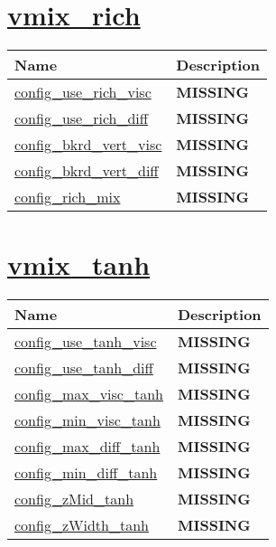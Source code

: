 \section[vmix\_rich]{\hyperref[sec:nm_sec_vmix_rich]{vmix\_rich}}
\label{sec:nm_tab_vmix_rich}
{\small
\begin{center}
\begin{longtable}{| p{2.0in} || p{4.0in} |}
	\hline
	{\bf Name} & {\bf Description} \\
	\hline
	\hline
	\hyperref[subsec:nm_sec_config_use_rich_visc]{config\_use\_rich\_visc} & {\bf \color{red} MISSING} \\
	\hline
	\hyperref[subsec:nm_sec_config_use_rich_diff]{config\_use\_rich\_diff} & {\bf \color{red} MISSING} \\
	\hline
	\hyperref[subsec:nm_sec_config_bkrd_vert_visc]{config\_bkrd\_vert\_visc} & {\bf \color{red} MISSING} \\
	\hline
	\hyperref[subsec:nm_sec_config_bkrd_vert_diff]{config\_bkrd\_vert\_diff} & {\bf \color{red} MISSING} \\
	\hline
	\hyperref[subsec:nm_sec_config_rich_mix]{config\_rich\_mix} & {\bf \color{red} MISSING} \\
	\hline
\end{longtable}
\end{center}
}
\section[vmix\_tanh]{\hyperref[sec:nm_sec_vmix_tanh]{vmix\_tanh}}
\label{sec:nm_tab_vmix_tanh}
{\small
\begin{center}
\begin{longtable}{| p{2.0in} || p{4.0in} |}
	\hline
	{\bf Name} & {\bf Description} \\
	\hline
	\hline
	\hyperref[subsec:nm_sec_config_use_tanh_visc]{config\_use\_tanh\_visc} & {\bf \color{red} MISSING} \\
	\hline
	\hyperref[subsec:nm_sec_config_use_tanh_diff]{config\_use\_tanh\_diff} & {\bf \color{red} MISSING} \\
	\hline
	\hyperref[subsec:nm_sec_config_max_visc_tanh]{config\_max\_visc\_tanh} & {\bf \color{red} MISSING} \\
	\hline
	\hyperref[subsec:nm_sec_config_min_visc_tanh]{config\_min\_visc\_tanh} & {\bf \color{red} MISSING} \\
	\hline
	\hyperref[subsec:nm_sec_config_max_diff_tanh]{config\_max\_diff\_tanh} & {\bf \color{red} MISSING} \\
	\hline
	\hyperref[subsec:nm_sec_config_min_diff_tanh]{config\_min\_diff\_tanh} & {\bf \color{red} MISSING} \\
	\hline
	\hyperref[subsec:nm_sec_config_zMid_tanh]{config\_zMid\_tanh} & {\bf \color{red} MISSING} \\
	\hline
	\hyperref[subsec:nm_sec_config_zWidth_tanh]{config\_zWidth\_tanh} & {\bf \color{red} MISSING} \\
	\hline
\end{longtable}
\end{center}
}
